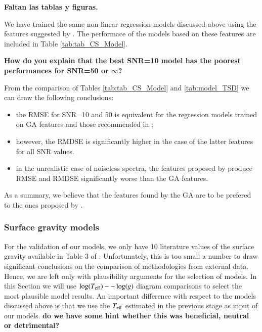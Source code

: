 {\bf Faltan las tablas y figuras.}




We have trained the same non linear regression models discussed above
using the features suggested by \cite{cesetti}. The performace of the
models based on these features are included in Table
\ref{tab:tab_CS_Model}.


{\bf How do you explain that the best SNR=10 model has the poorest
  performances for SNR=50 or $\infty$?}

From the comparison of Tables \ref{tab:tab_CS_Model} and
\ref{tab:model_TSD} we can draw the following conclusions:

\begin{itemize}
\item the RMSE for SNR=10 and 50 is equivalent for the regression
  models trained on GA features and those recommended in
  \cite{cesetti};
  \item however, the RMDSE is significantly higher in the case of the
    latter features for all SNR values.
    \item in the unrealistic case of noiseless spectra, the features
      proposed by \cite{cesetti} produce RMSE and RMDSE significantly
      worse than the GA features.
\end{itemize}

As a summary, we believe that the features found by the GA are to be
prefered to the ones proposed by \cite{cesetti}.

\subsubsection{Surface gravity models}

For the validation of our models, we only have 10 literature values of
the surface gravity available in Table 3 of
\cite{cesetti}. Unfortunately, this is too small a number to draw
significant conclusions on the comparison of methodologies from
external data. Hence, we are left only with plausibility arguments for
the selection of models. In this Section we will use $\log(T_{\rm
  eff})--\log(g)$ diagram comparisons to select the most plausible
model results. An important difference with respect to the models
discussed above is that we use the $T_{\rm eff}$ estimated in the
previous stage as input of our models. {\bf do we have some hint
  whether this was beneficial, neutral or detrimental?}

